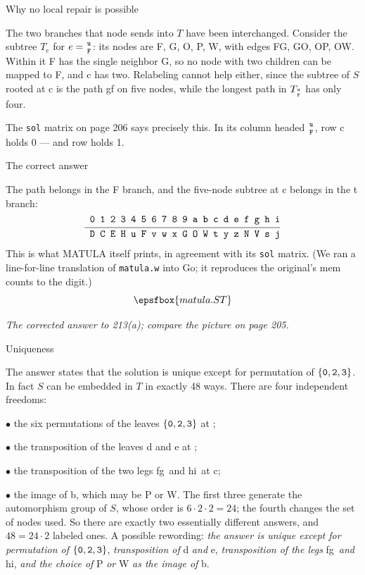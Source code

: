 \beginsection Why no local repair is possible

The two branches that node  sends into $T$ have been interchanged. Consider
the subtree $T_e$ for $e={{\tt u}\atop{\tt F}}$: its nodes are \n F, \n G, \n O, \n P, \n W,
with edges \edge FG, \edge GO, \edge OP, \edge OW. Within it \n F has the
single neighbor \n G, so no node with two children can be mapped to \n F,
and \n c has two. Relabeling cannot help either, since the subtree of $S$
rooted at \n c is the path \edge gf on five
nodes, while the longest path in $T_{{{\tt u}\atop{\tt F}}}$ has only four.

The {\tt sol} matrix on page 206 says precisely this. In its column headed
${{\tt u}\atop{\tt F}}$, row \n c holds 0 --- and row  holds 1.

\beginsection The correct answer

The path  belongs in the \n F branch, and the
five-node subtree at \n c belongs in the \n t branch:
$$\vbox{\halign{\hbox to 1.05em{\hfil\tt #}&&\hbox to 1.05em{\hfil\tt #}\cr
0&1&2&3&4&5&6&7&8&9&a&b&c&d&e&f&g&h&i\cr
\noalign{\smallskip\hrule\smallskip}
D&C&E&H&u&F&v&w&x&G&O&W&t&y&z&N&V&s&j\cr}}$$
This is what MATULA itself prints, in agreement with its {\tt sol} matrix.
(We ran a line-for-line translation of {\tt matula.w} into Go; it reproduces
the original's mem counts to the digit.)
 
$$\epsfbox{matula.ST}$$
 
\centerline{\it The corrected answer to {\rm 213(a)}; compare the picture on
page 205.}

\beginsection Uniqueness

The answer states that the solution is unique except for permutation of
$\{{\tt 0},{\tt 2},{\tt 3}\}$. In fact $S$ can be embedded in $T$ in exactly 48 ways.
There are four independent freedoms:
\medskip
\item{$\bullet$} the six permutations of the leaves $\{{\tt 0},{\tt 2},{\tt 3}\}$ at ;
\item{$\bullet$} the transposition of the leaves \n d and \n e at ;
\item{$\bullet$} the transposition of the two legs \edge fg\ and \edge hi\ at \n c;
\item{$\bullet$} the image of \n b, which may be \n P or \n W.
\medskip
\noindent
The first three generate the automorphism group of $S$, whose order is
$6\cdot2\cdot2=24$; the fourth changes the set of nodes used. So there are
exactly two essentially different answers, and $48=24\cdot2$ labeled ones.
A possible rewording: {\it the answer is unique except for permutation of\/}
$\{{\tt 0},{\tt 2},{\tt 3}\}$, {\it transposition of\/} \n d {\it and\/} \n e, {\it
transposition of the legs\/} \edge fg\ {\it and\/} \edge hi, {\it and the
choice of\/} \n P {\it or\/} \n W {\it as the image of\/} \n b.

